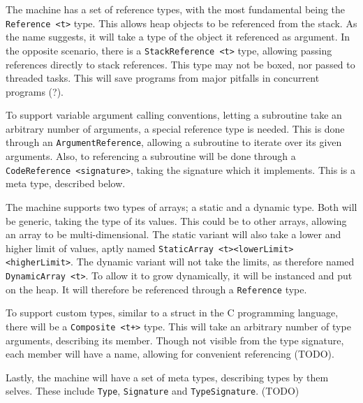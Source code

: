 
The machine has a set of reference types, with the most fundamental being the
{\tt Reference <t>} type. This allows heap objects to be referenced from the
stack. As the name suggests, it will take a type of the object it referenced as
argument. In the opposite scenario, there is a {\tt StackReference <t>} type,
allowing passing references directly to stack references. This type may not be
boxed, nor passed to threaded tasks. This will save programs from major pitfalls
in concurrent programs (?).

To support variable argument calling conventions, letting a subroutine take an
arbitrary number of arguments, a special reference type is needed. This is done
through an {\tt ArgumentReference}, allowing a subroutine to iterate over its
given arguments. Also, to referencing a subroutine will be done through a {\tt
  CodeReference <signature>}, taking the signature which it implements. This is
a meta type, described below.


The machine supports two types of arrays; a static and a dynamic type. Both will
be generic, taking the type of its values. This could be to other arrays,
allowing an array to be multi-dimensional. The static variant will also take a
lower and higher limit of values, aptly named {\tt StaticArray
  <t><lowerLimit><higherLimit>}. The dynamic variant will not take the limits,
as therefore named {\tt DynamicArray <t>}. To allow it to grow dynamically, it
will be instanced and put on the heap. It will therefore be referenced through a
{\tt Reference} type.


To support custom types, similar to a struct in the C programming language,
there will be a {\tt Composite <t+>} type. This will take an arbitrary number of
type arguments, describing its member. Though not visible from the type
signature, each member will have a name, allowing for convenient referencing (TODO).

Lastly, the machine will have a set of meta types, describing types by them
selves. These include {\tt Type}, {\tt Signature} and {\tt TypeSignature}. (TODO)




